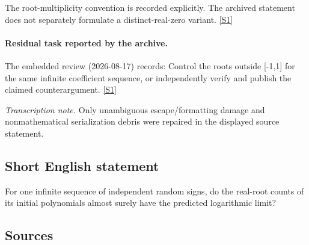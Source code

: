 \documentclass[11pt,a4paper]{article}
\newcommand{\sref}[2]{\hyperlink{source:#1:#2}{[S#2]}}
\begin{document}
The root-multiplicity convention is recorded explicitly. The archived statement does not separately formulate a distinct-real-zero variant. \sref{statement}{1}

\paragraph{Residual task reported by the archive.}

The embedded review (2026-08-17) records: Control the roots outside [-1,1] for the same infinite coefficient sequence, or independently verify and publish the claimed counterargument. \sref{statement}{1}

{\small\emph{Transcription note.} Only unambiguous escape/formatting damage and nonmathematical serialization debris were repaired in the displayed source statement.}

\subsection{Short English statement}

For one infinite sequence of independent random signs, do the real-root counts of its initial polynomials almost surely have the predicted logarithmic limit?

\subsection{Sources}
\end{document}
